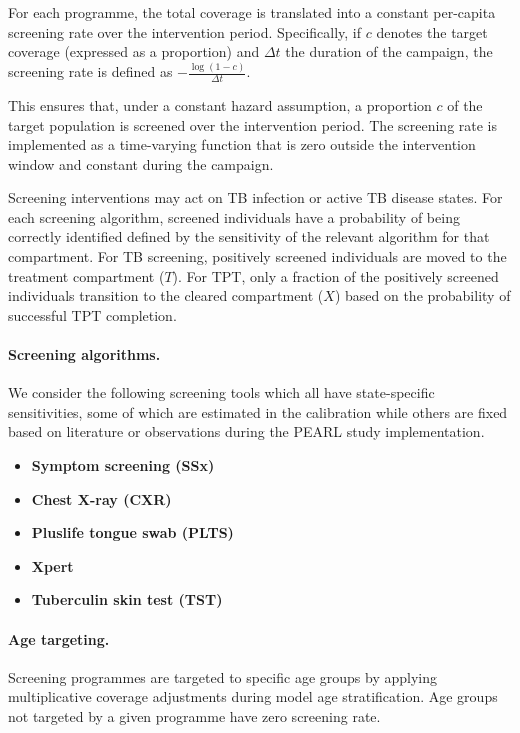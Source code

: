 \documentclass[11pt]{article}
\begin{document}
For each programme, the total coverage is translated into a constant per-capita screening rate over the intervention period. Specifically, if \(c\) denotes the target coverage (expressed as a proportion) and \(\Delta t\) the duration of the campaign, 
the screening rate is defined as \(-\frac{\log(1 - c)}{\Delta t}\).

This ensures that, under a constant hazard assumption, a proportion \(c\) of the target population is screened over the intervention period. The screening rate is implemented as a time-varying function that is zero outside the intervention window and constant during the campaign.

Screening interventions may act on TB infection or active TB disease states. For each screening algorithm, screened individuals have a probability of being correctly identified defined by the sensitivity of the relevant algorithm for that compartment. 
For TB screening, positively screened individuals are moved to the treatment compartment (\(T\)). 
For TPT, only a fraction of the positively screened individuals transition to the cleared compartment (\(X\)) based on the probability of successful TPT completion.

\paragraph{Screening algorithms.}

We consider the following screening tools which all have state-specific sensitivities, some of which are estimated in the calibration while others are fixed based on literature or observations during the PEARL study implementation.

\begin{itemize}
    \item \textbf{Symptom screening (SSx)}   
    \item \textbf{Chest X-ray (CXR)}    
    \item \textbf{Pluslife tongue swab (PLTS)} 
    \item \textbf{Xpert}
    \item \textbf{Tuberculin skin test (TST)} 
\end{itemize}

\paragraph{Age targeting.}
Screening programmes are targeted to specific age groups by applying multiplicative coverage adjustments during model age stratification. Age groups not targeted by a given programme have zero screening rate.
\end{document}
